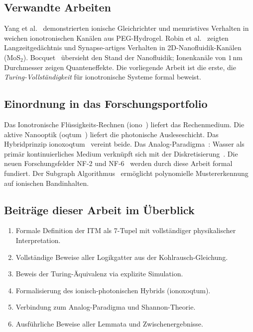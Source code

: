 ﻿\documentclass[a4paper,12pt]{article}
\theoremstyle{plain}
\theoremstyle{definition}
\theoremstyle{remark}
\begin{document}
\subsection{Verwandte Arbeiten}

Yang et al.~\cite{yang2018} demonstrierten ionische Gleichrichter und
memristives Verhalten in weichen ionotronischen Kan\"alen aus
PEG-Hydrogel.
Robin et al.~\cite{robin2021} zeigten Langzeitged\"achtnis und
Synapse-artiges Verhalten in 2D-Nanofluidik-Kan\"alen (MoS$_2$).
Bocquet~\cite{bocquet2020} \"ubersieht den Stand der Nanofluidik;
Ionenkan\"ale von $1\,$nm Durchmesser zeigen Quanteneffekte.
Die vorliegende Arbeit ist die erste, die \emph{Turing-Vollst\"andigkeit}
f\"ur ionotronische Systeme formal beweist.

\subsection{Einordnung in das Forschungsportfolio}

Das Ionotronische Fl\"ussigkeits-Rechnen (iono~\cite{epp2026iono}) liefert
das Rechenmedium.
Die aktive Nanooptik (oqtum~\cite{epp2026oqtum}) liefert die photonische
Ausleseschicht.
Das Hybridprinzip ionoxoqtum~\cite{epp2026ionoxoqtum} vereint beide.
Das Analog-Paradigma~\cite{epp2026analog}: Wasser als prim\"ar kontinuierliches
Medium verkn\"upft sich mit der Diskretisierung~\cite{epp2026digi}.
Die neuen Forschungsfelder NF-2 und NF-6~\cite{epp2026nf_all} werden
durch diese Arbeit formal fundiert.
Der Subgraph Algorithmus~\cite{epp2026subgraph} erm\"oglicht polynomielle
Mustererkennung auf ionischen Bandinhalten.

\subsection{Beitr\"age dieser Arbeit im \"Uberblick}

\begin{enumerate}
\item Formale Definition der ITM als 7-Tupel
      mit vollst\"andiger physikalischer Interpretation.
\item Vollst\"andige Beweise aller Logikgatter aus der Kohlrausch-Gleichung.
\item Beweis der Turing-\"Aquivalenz via explizite Simulation.
\item Formalisierung des ionisch-photonischen Hybrids (ionoxoqtum).
\item Verbindung zum Analog-Paradigma und Shannon-Theorie.
\item Ausf\"uhrliche Beweise aller Lemmata und Zwischenergebnisse.
\end{enumerate}
\end{document}
